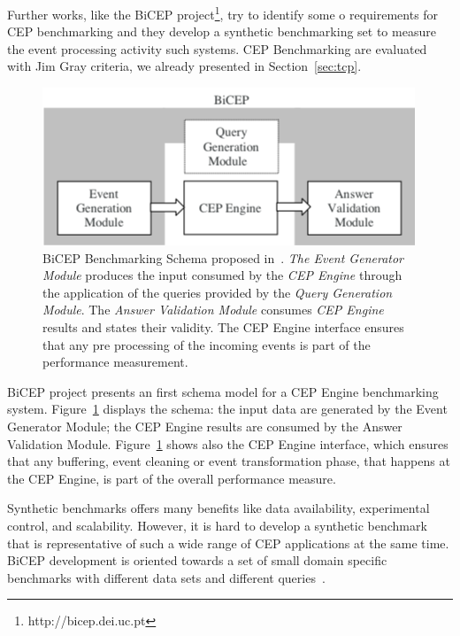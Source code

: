 Further works, like the BiCEP project\footnote{http://bicep.dei.uc.pt}, try to identify some o requirements for CEP benchmarking and they develop a synthetic benchmarking set to measure the event processing activity such systems. CEP Benchmarking are evaluated with Jim Gray criteria, we already presented in Section~\ref{sec:tcp}. 

\begin{figure}[tbh]
  \centering
	\includegraphics[width=\linewidth]{images/bicep_schema}
	\caption[BiCEP Benchmarking Schema]{BiCEP Benchmarking Schema proposed in~\cite{bizarro:DSP:2007:1143}. \textit{The Event Generator Module} produces the input consumed by the \textit{CEP Engine} through the application of the queries provided by the \textit{Query Generation Module}. The \textit{Answer Validation Module} consumes \textit{CEP Engine} results and states their validity. The CEP Engine interface ensures that any pre processing of the incoming events is part of the performance measurement.} 
  	\label{fig:bicep-schema}
\end{figure}

BiCEP project presents an first schema model for a CEP Engine benchmarking system. Figure~\ref{fig:bicep-schema} displays the schema: the input data are generated by the Event Generator Module; the CEP Engine results are consumed by the Answer Validation Module. Figure~\ref{fig:bicep-schema} shows also the CEP Engine interface, which ensures that any buffering, event cleaning or event transformation phase, that happens at the CEP Engine, is part of the overall performance measure. 

Synthetic benchmarks offers many benefits like data availability, experimental control, and scalability. However, it is hard to develop a synthetic benchmark that is representative of such a wide range of CEP applications at the same time. BiCEP development is oriented towards a set of small domain specific benchmarks with different data sets and different queries~\cite{bizarro:DSP:2007:1143}.

